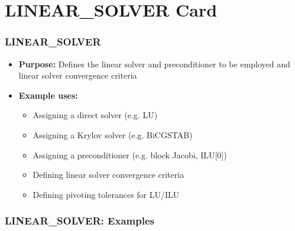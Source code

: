 \section{LINEAR\_SOLVER Card}

\begin{frame}\frametitle{LINEAR\_SOLVER}

\begin{itemize}
\item[] \textbf{Purpose:} Defines the linear solver and preconditioner to be employed and linear solver convergence criteria
\item[] \textbf{Example uses:}
\begin{itemize}
  \item Assigning a direct solver (e.g. LU)
  \item Assigning a Krylov solver (e.g. BiCGSTAB)
  \item Assigning a preconditioner (e.g. block Jacobi, ILU[0])
  \item Defining linear solver convergence criteria
  \item Defining pivoting tolerances for LU/ILU
\end{itemize}
\end{itemize}

\end{frame}

\begin{frame}[fragile]\frametitle{LINEAR\_SOLVER: Examples}

\end{frame}
